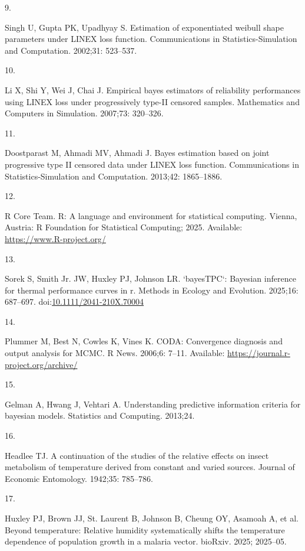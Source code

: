 \documentclass[
  11pt,
  letterpaper,
]{article}
\newlength{\cslhangindent}
\newlength{\csllabelwidth}
\newenvironment{CSLReferences}[2] %
 {\begin{list}{}{%
  \setlength{\itemindent}{0pt}
  \setlength{\leftmargin}{0pt}
  \setlength{\parsep}{0pt}
  \ifodd #1
   \setlength{\leftmargin}{\cslhangindent}
   \setlength{\itemindent}{-1\cslhangindent}
  \fi
  \setlength{\itemsep}{#2\baselineskip}}}
 {\end{list}}
\newcommand{\CSLLeftMargin}[1]{\parbox[t]{\csllabelwidth}{\strut#1\strut}}
\newcommand{\CSLRightInline}[1]{\parbox[t]{\linewidth - \csllabelwidth}{\strut#1\strut}}
\begin{document}
\begin{CSLReferences}{0}{1}
\CSLLeftMargin{9. }%
\CSLRightInline{Singh U, Gupta PK, Upadhyay S. Estimation of
exponentiated weibull shape parameters under LINEX loss function.
Communications in Statistics-Simulation and Computation. 2002;31:
523--537. }

\CSLLeftMargin{10. }%
\CSLRightInline{Li X, Shi Y, Wei J, Chai J. Empirical bayes estimators
of reliability performances using LINEX loss under progressively type-II
censored samples. Mathematics and Computers in Simulation. 2007;73:
320--326. }

\CSLLeftMargin{11. }%
\CSLRightInline{Doostparast M, Ahmadi MV, Ahmadi J. Bayes estimation
based on joint progressive type II censored data under LINEX loss
function. Communications in Statistics-Simulation and Computation.
2013;42: 1865--1886. }

\CSLLeftMargin{12. }%
\CSLRightInline{R Core Team. R: A language and environment for
statistical computing. Vienna, Austria: R Foundation for Statistical
Computing; 2025. Available: \url{https://www.R-project.org/}}

\CSLLeftMargin{13. }%
\CSLRightInline{Sorek S, Smith Jr. JW, Huxley PJ, Johnson LR.
`bayesTPC`: Bayesian inference for thermal performance curves in r.
Methods in Ecology and Evolution. 2025;16: 687--697.
doi:\href{https://doi.org/10.1111/2041-210X.70004}{10.1111/2041-210X.70004}}

\CSLLeftMargin{14. }%
\CSLRightInline{Plummer M, Best N, Cowles K, Vines K. CODA: Convergence
diagnosis and output analysis for MCMC. R News. 2006;6: 7--11.
Available: \url{https://journal.r-project.org/archive/}}

\CSLLeftMargin{15. }%
\CSLRightInline{Gelman A, Hwang J, Vehtari A. Understanding predictive
information criteria for bayesian models. Statistics and Computing.
2013;24. }

\CSLLeftMargin{16. }%
\CSLRightInline{Headlee TJ. A continuation of the studies of the
relative effects on insect metabolism of temperature derived from
constant and varied sources. Journal of Economic Entomology. 1942;35:
785--786. }

\CSLLeftMargin{17. }%
\CSLRightInline{Huxley PJ, Brown JJ, St. Laurent B, Johnson B, Cheung
OY, Asamoah A, et al. Beyond temperature: Relative humidity
systematically shifts the temperature dependence of population growth in
a malaria vector. bioRxiv. 2025; 2025--05. }


\end{CSLReferences}
\end{document}
